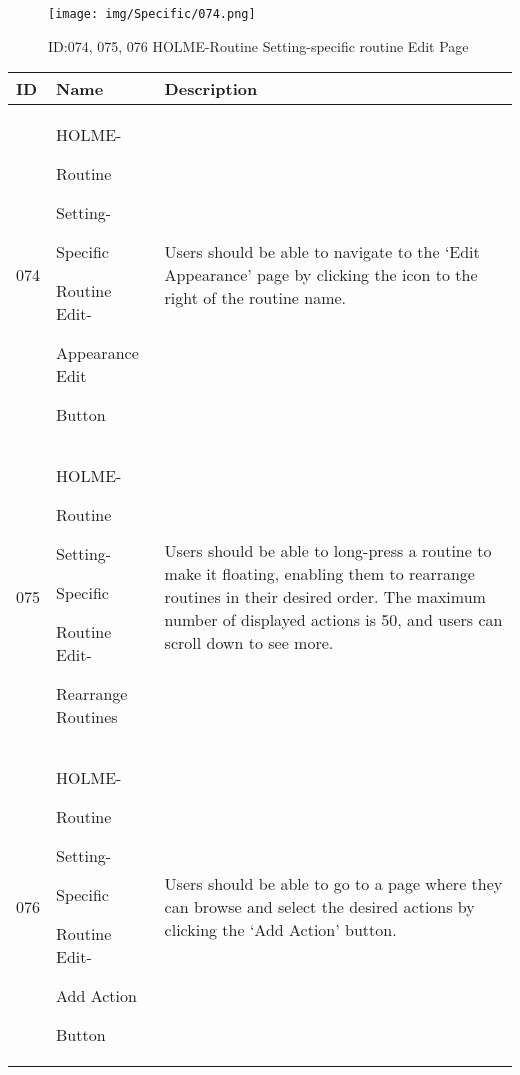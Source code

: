 \documentclass[conference]{IEEEtran}
\begin{document}
\begin{enumerate}
\begin{figure}[h]
\centering                                         
\texttt{[image: img/Specific/074.png]}
\caption{ID:074, 075, 076 HOLME-Routine Setting-specific routine Edit Page}
\end{figure}
\begin{table}[h]
\def\arraystretch{1.2} \small
    \begin{tabular}{|p{1cm}|p{1.8cm}|p{5.0cm}|}
        \hline
        ID & Name & Description\\ \hline
         074 \par  & HOLME-\par Routine \par Setting- \par Specific  \par Routine Edit- \par Appearance Edit \par Button & 
Users should be able to navigate to the `Edit Appearance' page by clicking the icon to the right of the routine name.\\ \hline
075 \par  & HOLME-\par Routine \par Setting- \par Specific  \par Routine Edit- \par Rearrange Routines & 
Users should be able to long-press a routine to make it floating, enabling them to rearrange routines in their desired order. The maximum number of displayed actions is 50, and users can scroll down to see more.\\ \hline
076 \par  & HOLME-\par Routine \par Setting- \par Specific  \par Routine Edit- \par Add Action \par Button & 

Users should be able to go to a page where they can browse and select the desired actions by clicking the `Add Action' button.\\ \hline
    \end{tabular}
\end{table}
\clearpage


\end{enumerate}
\end{document}
